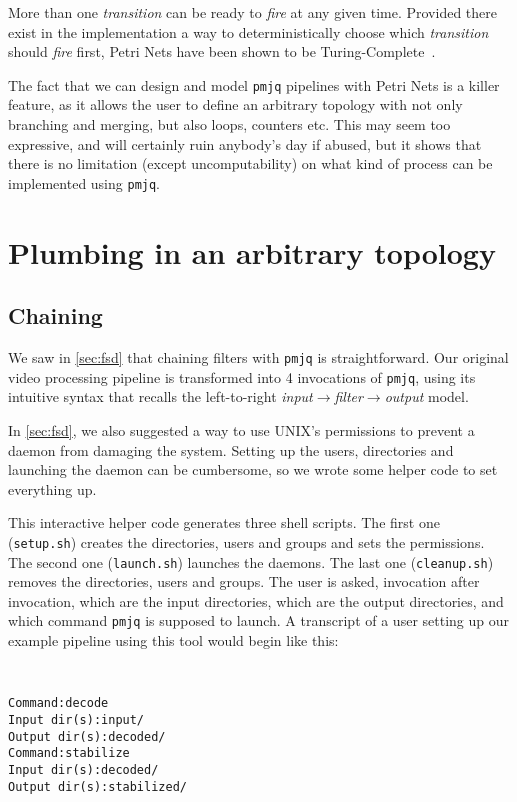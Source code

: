 \documentclass[letterpaper,twocolumn,10pt]{article}
\begin{document}
More than one \emph{transition} can be ready to \emph{fire} at any given time. Provided there exist in the implementation a way to deterministically choose which \emph{transition} should \emph{fire} first, Petri Nets have been shown to be Turing-Complete~\cite{petrituring}.

The fact that we can design and model {\tt pmjq} pipelines with Petri Nets is a killer feature, as it allows the user to define an arbitrary topology with not only branching and merging, but also loops, counters etc. This may seem too expressive, and will certainly ruin anybody's day if abused, but it shows that there is no limitation (except uncomputability) on what kind of process can be implemented using {\tt pmjq}.

\section{Plumbing in an arbitrary topology}
\subsection{Chaining}
We saw in \autoref{sec:fsd} that chaining filters with {\tt pmjq} is straightforward. Our original video processing pipeline is transformed into 4 invocations of {\tt pmjq}, using its intuitive syntax that recalls the left-to-right \emph{input}$\rightarrow$\emph{filter}$\rightarrow$\emph{output} model.

In \autoref{sec:fsd}, we also suggested a way to use UNIX's permissions to prevent a daemon from damaging the system. Setting up the users, directories and launching the daemon can be cumbersome, so we wrote some helper code to set everything up.

This interactive helper code generates three shell scripts. The first one ({\tt setup.sh}) creates the directories, users and groups and sets the permissions. The second one ({\tt launch.sh}) launches the daemons. The last one ({\tt cleanup.sh}) removes the directories, users and groups. The user is asked, invocation after invocation, which are the input directories, which are the output directories, and which command {\tt pmjq} is supposed to launch. A transcript of a user setting up our example pipeline using this tool would begin like this:
{\tt \small
\begin{verbatim}
Command:decode
Input dir(s):input/
Output dir(s):decoded/
Command:stabilize
Input dir(s):decoded/
Output dir(s):stabilized/
\end{verbatim}
}
\end{document}
